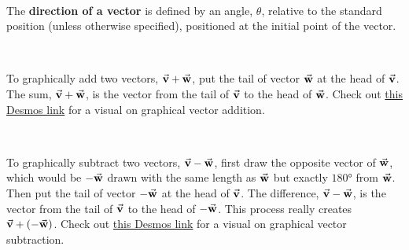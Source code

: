 \newpage

\begin{myDefinition}~\\[0.5mm]
	The \textbf{direction of a vector} is defined by an angle, $\theta$, relative to the standard position (unless otherwise specified), positioned at the initial point of the vector.
\end{myDefinition}

\begin{myDefinition}~\\[0.5mm]
	\begin{minipage}{0.9\textwidth}
        To graphically add two vectors, $\vec{\textbf{v}}+\vec{\textbf{w}}$, put the tail of vector $\vec{\textbf{w}}$ at the head of $\vec{\textbf{v}}$. The sum, $\vec{\textbf{v}}+\vec{\textbf{w}}$, is the vector from the tail of $\vec{\textbf{v}}$ to the head of $\vec{\textbf{w}}$. Check out \href{http://tiny.cc/vector-addition}{this Desmos link} for a visual on graphical vector addition.
    \end{minipage}
	\begin{minipage}{2cm}
    \end{minipage}
\end{myDefinition}

\begin{myDefinition}~\\[0.5mm]
	\begin{minipage}{0.9\textwidth}
    	To graphically subtract two vectors, $\vec{\textbf{v}}-\vec{\textbf{w}}$, first draw the opposite vector of $\vec{\textbf{w}}$, which would be $-\vec{\textbf{w}}$ drawn with the same length as $\vec{\textbf{w}}$ but exactly $\ang{180}$ from $\vec{\textbf{w}}$. Then put the tail of vector $-\vec{\textbf{w}}$ at the head of $\vec{\textbf{v}}$. The difference, $\vec{\textbf{v}}-\vec{\textbf{w}}$, is the vector from the tail of $\vec{\textbf{v}}$ to the head of $-\vec{\textbf{w}}$. This process really creates $\vec{\textbf{v}}+(-\vec{\textbf{w}})$. Check out \href{http://tiny.cc/vector-subtraction}{this Desmos link} for a visual on graphical vector subtraction.
	\end{minipage}
	\begin{minipage}{2cm}
	\end{minipage}
\end{myDefinition}

